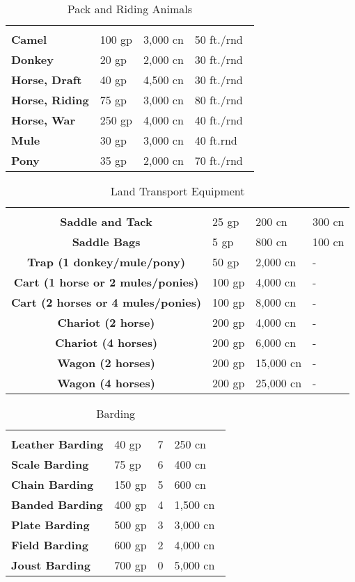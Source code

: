 \begin{multicols*}{2}
\begin {table}[H]
  \caption{Pack and Riding Animals}\label{tab:Pack and Riding Animals}
  \begin{tabularx}{\columnwidth}{>{\bfseries}YYYY}
		 &  &  & \\
		Camel & 100 gp & 3,000 cn & 50 ft./rnd\\
		Donkey & 20 gp & 2,000 cn & 30 ft./rnd\\
		Horse, Draft & 40 gp & 4,500 cn & 30 ft./rnd\\
		Horse, Riding & 75 gp & 3,000 cn & 80 ft./rnd\\
		Horse, War & 250 gp & 4,000 cn & 40 ft./rnd\\
		Mule & 30 gp & 3,000 cn & 40 ft.rnd\\
		Pony & 35 gp & 2,000 cn & 70 ft./rnd\
  \end {tabularx}
\end {table}

\begin {table}[H]
  \caption{Land Transport Equipment}
	\begin{tabularx}{\columnwidth}{>{\bfseries}cYYY}
		 &  &  & \\
		Saddle and Tack & 25 gp & 200 cn & 300 cn\\
		Saddle Bags & 5 gp & 800 cn & 100 cn\\
		Trap (1 donkey/mule/pony) & 50 gp & 2,000 cn & -\\
		Cart (1 horse or 2 mules/ponies) & 100 gp & 4,000 cn & -\\
		Cart (2 horses or 4 mules/ponies) & 100 gp & 8,000 cn & -\\
		Chariot (2 horse) & 200 gp & 4,000 cn & -\\
		Chariot (4 horses) & 200 gp & 6,000 cn & -\\
		Wagon (2 horses) & 200 gp & 15,000 cn & -\\
		Wagon (4 horses) & 200 gp & 25,000 cn & -\
  \end {tabularx}
\end {table}

\begin {table}[H]
  \caption{Barding}
  \begin{tabularx}{\columnwidth}{>{\bfseries}YYYY}
		\thead{Item} &  &  & \\
		Leather Barding & 40 gp & 7 & 250 cn\\
		Scale Barding & 75 gp & 6 & 400 cn\\
		Chain Barding & 150 gp & 5 & 600 cn\\
		Banded Barding & 400 gp & 4 & 1,500 cn\\
		Plate Barding & 500 gp & 3 & 3,000 cn\\
		Field Barding & 600 gp & 2 & 4,000 cn\\
		Joust Barding & 700 gp & 0 & 5,000 cn\
  \end {tabularx}
\end {table}


\end{multicols*}
